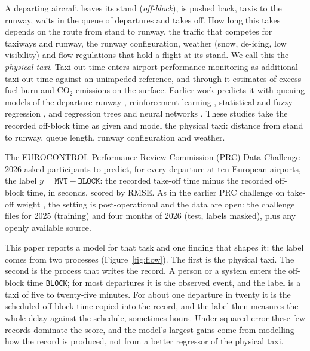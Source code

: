 \documentclass[
  manuscript=article,
  layout=preprint,
  year=2026,
  volume=x,
]{extra/joas}
\newcommand{\fld}[1]{\texttt{#1}}
\begin{document}
A departing aircraft leaves its stand (\emph{off-block}), is pushed back, taxis to the runway, waits in the queue of departures and takes
off. How long this takes depends on the route from stand to runway, the traffic that competes for taxiways and runway, the runway
configuration, weather (snow, de-icing, low visibility) and flow regulations that hold a flight at its stand. We call this the
\emph{physical taxi}. Taxi-out time enters airport performance monitoring as additional taxi-out time against an unimpeded reference, and
through it estimates of excess fuel burn and CO$_2$ emissions on the surface. Earlier work predicts it with queuing models of the
departure runway \cite{simaiakis2016queuing}, reinforcement learning \cite{balakrishna2010rl}, statistical and fuzzy regression
\cite{ravizza2014taxi}, and regression trees and neural networks \cite{herrema2018taxi}. These studies take the recorded off-block time as
given and model the physical taxi: distance from stand to runway, queue length, runway configuration and weather.

The EUROCONTROL Performance Review Commission (PRC) Data Challenge 2026 \cite{prc2026challenge} asked participants to predict, for every
departure at ten European airports, the label $y = \fld{MVT} - \fld{BLOCK}$: the recorded take-off time minus the recorded off-block time,
in seconds, scored by RMSE. As in the earlier PRC challenge on take-off weight \cite{spinielli2025tow,murca2025tow}, the setting is
post-operational and the data are open: the challenge files for 2025 (training) and four months of 2026 (test, labels masked), plus any
openly available source.

This paper reports a model for that task and one finding that shapes it: the label comes from two processes (Figure~\ref{fig:flow}).
The first is the physical taxi. The second is the process that writes the record. A person or a system enters the off-block time
\fld{BLOCK}; for most departures it is the observed event, and the label is a taxi of five to twenty-five minutes. For about one
departure in twenty it is the scheduled off-block time copied into the record, and the label then measures the whole delay against the
schedule, sometimes hours. Under squared error these few records dominate the score, and the model's largest gains come from modelling
how the record is produced, not from a better regressor of the physical taxi.
\end{document}
